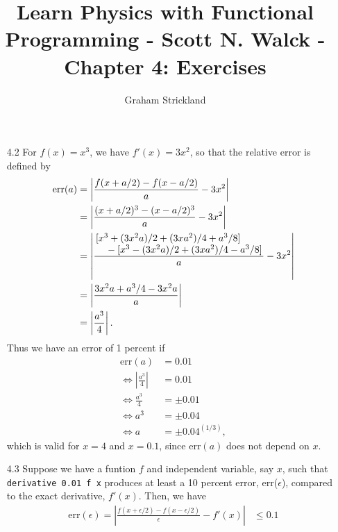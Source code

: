 \documentclass{article}
\title{Learn Physics with Functional Programming - Scott N. Walck - Chapter 4: Exercises}
\author{Graham Strickland}
\begin{document}
\maketitle  

\begin{itemize}
    \item[4.2]
    For $f(x) = x^3$, we have $f'(x) = 3x^2$, so that the relative error is defined by
    \begin{equation*}
        \begin{split}
            \text{err}(a) &= \left| \frac{f(x + a/2) - f(x - a/2)}{a} - 3x^2 \right| \\
            &= \left| \frac{(x + a/2)^3 - (x - a/2)^3}{a} - 3x^2 \right| \\
            &= \left| \frac{\splitfrac{[x^3 + (3x^2a)/2 + (3xa^2)/4 + a^3/8]}
                {{} - [x^3 - (3x^2a)/2 + (3xa^2)/4 - a^3/8]}}{a} - 3x^2 \right| \\
            &= \left| \frac{3x^2a + a^3/4 - 3x^2a}{a} \right| \\
            &= \left| \frac{a^3}{4} \right|.
        \end{split}
    \end{equation*}
    \qquad Thus we have an error of 1 percent if 
    \begin{equation*}
        \begin{split}
            \text{err}(a) &= 0.01 \\
            \Leftrightarrow \left|\frac{a^3}{4}\right| &= 0.01 \\
            \Leftrightarrow \frac{a^3}{4} &= \pm 0.01 \\
            \Leftrightarrow a^3 &= \pm 0.04 \\
            \Leftrightarrow a &= \pm {0.04}^{(1/3)},
        \end{split}
    \end{equation*}
    which is valid for $x = 4$ and $x = 0.1$, since $\text{err}(a)$ does not depend on $x$.
    \item[4.3]
    Suppose we have a funtion $f$ and independent variable, say $x$, such that 
    \verb|derivative 0.01 f x| produces at least a 10 percent error, err($\epsilon$), compared to 
    the exact derivative, $f'(x)$. Then, we have
    \begin{equation*}
        \begin{split}
            \text{err}(\epsilon) = \left| \frac{f(x + \epsilon/2) - f(x - \epsilon/2)}{\epsilon} - 
            f'(x) \right|
            &\leq 0.1 \\

\end{split}
\end{equation*}
\end{itemize}
\end{document}
